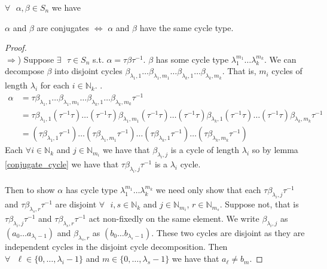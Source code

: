 \begin{theorem}
	\label{conjugate_cycle_type}
	$\forall\text{ }\alpha, \beta \in S_n$ we have
	\begin{center}
		$\alpha$ and $\beta$ are conjugates $\iff$ $\alpha$ and $\beta$ have the same cycle type.
	\end{center}
\end{theorem}
\begin{proof}
	\text{}\\$\Rightarrow$) Suppose $\exists\text{ }\tau\in S_n$ s.t. $\alpha = \tau\beta\tau^{-1}$. $\beta$ has some cycle type $\lambda_1^{m_1}\dots\lambda_k^{m_k}$. We can decompose
	$\beta$ into disjoint cycles $\beta_{\lambda_1, 1}\dots\beta_{\lambda_1, m_1}\dots\beta_{\lambda_k, 1}\dots\beta_{\lambda_k, m_k}$. That is, $m_i$ cycles of length $\lambda_i$ for each $i \in \mathbb{N}_k$. .
		\begin{align*}
			\alpha & = \tau\beta_{\lambda_1, 1}\dots\beta_{\lambda_1, m_1}\dots\beta_{\lambda_k, 1}\dots\beta_{\lambda_k, m_k}\tau^{-1}                                                                                           \\
			       & = \tau\beta_{\lambda_1, 1}(\tau^{-1}\tau)\dots(\tau^{-1}\tau)\beta_{\lambda_1, m_1}(\tau^{-1}\tau)\dots(\tau^{-1}\tau)\beta_{\lambda_k, 1}(\tau^{-1}\tau)\dots(\tau^{-1}\tau)\beta_{\lambda_k, m_k}\tau^{-1} \\
			       & = (\tau\beta_{\lambda_1, 1}\tau^{-1})\dots(\tau\beta_{\lambda_1, m_1}\tau^{-1})\dots(\tau\beta_{\lambda_k, 1}\tau^{-1})\dots(\tau\beta_{\lambda_k, m_k}\tau^{-1})
		\end{align*}
		Each $\forall i \in \mathbb{N}_k$ and $j \in \mathbb{N}_{m_i}$ we have that $\beta_{\lambda_i, j}$ is a cycle of length $\lambda_i$ so by lemma \ref{conjugate_cycle} we have that $\tau\beta_{\lambda_i, j}\tau^{-1}$ is a $\lambda_i$ cycle.
		\\\\Then to show $\alpha$ has cycle type $\lambda_1^{m_1}\dots\lambda_k^{m_k}$ we need only show that each $\tau\beta_{\lambda_i, j}\tau^{-1}$ and $\tau\beta_{\lambda_s, r}\tau^{-1}$ are disjoint $\forall\text{ }i, s\in\mathbb{N}_k$ and $j\in\mathbb{N}_{m_i}$, $r\in\mathbb{N}_{m_s}$. Suppose not, that is $\tau\beta_{\lambda_i, j}\tau^{-1}$ and $\tau\beta_{\lambda_s, r}\tau^{-1}$ act non-fixedly on the same element. We write $\beta_{\lambda_i, j}$ as $(a_0\dots a_{\lambda_i-1})$ and $\beta_{\lambda_s, r}$ as $(b_0\dots b_{\lambda_s-1})$. These two cycles are disjoint as they are independent cycles in the disjoint cycle decomposition. Then $\forall\text{ }\ell\in\{0,\dots,\lambda_i-1\}$ and $m\in\{0,\dots,\lambda_s-1\}$ we have that $a_\ell \ne b_m$.

\end{proof}
